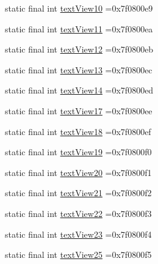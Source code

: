 \begin{DoxyCompactItemize}
\item 
static final int \mbox{\hyperlink{classbr_1_1unb_1_1cic_1_1mp_1_1marketmaster_1_1R_1_1id_a4bea02472408833948bbd24a0ee9a787}{text\+View10}} =0x7f0800e9
\item 
static final int \mbox{\hyperlink{classbr_1_1unb_1_1cic_1_1mp_1_1marketmaster_1_1R_1_1id_a5b2752d4e38b1aa7efc398649ee0af34}{text\+View11}} =0x7f0800ea
\item 
static final int \mbox{\hyperlink{classbr_1_1unb_1_1cic_1_1mp_1_1marketmaster_1_1R_1_1id_a32395222d72abd4dcc3f04105a12a66f}{text\+View12}} =0x7f0800eb
\item 
static final int \mbox{\hyperlink{classbr_1_1unb_1_1cic_1_1mp_1_1marketmaster_1_1R_1_1id_a9d0b0f3152e3e06bc62af2605cf5fceb}{text\+View13}} =0x7f0800ec
\item 
static final int \mbox{\hyperlink{classbr_1_1unb_1_1cic_1_1mp_1_1marketmaster_1_1R_1_1id_ab4df0b3438269c74563ab510ed8dd6bf}{text\+View14}} =0x7f0800ed
\item 
static final int \mbox{\hyperlink{classbr_1_1unb_1_1cic_1_1mp_1_1marketmaster_1_1R_1_1id_a8a58080fac05bb75f72bef45c8dd341b}{text\+View17}} =0x7f0800ee
\item 
static final int \mbox{\hyperlink{classbr_1_1unb_1_1cic_1_1mp_1_1marketmaster_1_1R_1_1id_a4ef5a996513c33a2a90dccd22ebf2b29}{text\+View18}} =0x7f0800ef
\item 
static final int \mbox{\hyperlink{classbr_1_1unb_1_1cic_1_1mp_1_1marketmaster_1_1R_1_1id_ac4dc6f8f3d91376c1dfef02564e9f3f5}{text\+View19}} =0x7f0800f0
\item 
static final int \mbox{\hyperlink{classbr_1_1unb_1_1cic_1_1mp_1_1marketmaster_1_1R_1_1id_a3e3dd24f6057581b4135ec5cdd645b5e}{text\+View20}} =0x7f0800f1
\item 
static final int \mbox{\hyperlink{classbr_1_1unb_1_1cic_1_1mp_1_1marketmaster_1_1R_1_1id_a67a69ecaf2c103f4816456f1feca97ed}{text\+View21}} =0x7f0800f2
\item 
static final int \mbox{\hyperlink{classbr_1_1unb_1_1cic_1_1mp_1_1marketmaster_1_1R_1_1id_a580f72febdb7ba60b30c1dcf78ea8db2}{text\+View22}} =0x7f0800f3
\item 
static final int \mbox{\hyperlink{classbr_1_1unb_1_1cic_1_1mp_1_1marketmaster_1_1R_1_1id_a8081b16c3e117b3fe399a6a5a557119c}{text\+View23}} =0x7f0800f4
\item 
static final int \mbox{\hyperlink{classbr_1_1unb_1_1cic_1_1mp_1_1marketmaster_1_1R_1_1id_ab73d8354b151cb7fc2c66dbd779b18d6}{text\+View25}} =0x7f0800f5
\item 

\end{DoxyCompactItemize}
